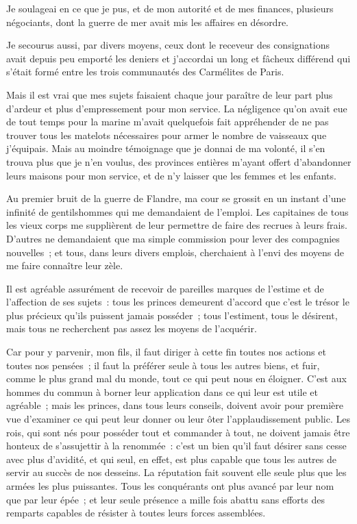 \documentclass[french,twoside]{book} %
\begin{document}
Je soulageai en ce que je pus, et de mon autorité et de mes finances, plusieurs négociants, dont la guerre de mer avait mis les affaires en désordre.\par
Je secourus aussi, par divers moyens, ceux dont le receveur des consignations avait depuis peu emporté les deniers et j’accordai un long et fâcheux différend qui s’était formé entre les trois communautés des Carmélites de Paris.\par
Mais il est vrai que mes sujets faisaient chaque jour paraître de leur part plus d’ardeur et plus d’empressement pour mon service. La négligence qu’on avait eue de tout temps pour la marine m’avait quelquefois fait appréhender de ne pas trouver tous les matelots nécessaires pour armer le nombre de vaisseaux que j’équipais. Mais au moindre témoignage que je donnai de ma volonté, il s’en trouva plus que je n’en voulus, des provinces entières m’ayant offert d’abandonner leurs maisons pour mon service, et de n’y laisser que les femmes et les enfants.\par
Au premier bruit de la guerre de Flandre, ma cour se grossit en un instant d’une infinité de gentilshommes qui me demandaient de l’emploi. Les capitaines de tous les vieux corps me supplièrent de leur permettre de faire des recrues à leurs frais. D’autres ne demandaient que ma simple commission pour lever des compagnies nouvelles ; et tous, dans leurs divers emplois, cherchaient à l’envi des moyens de me faire connaître leur zèle.\par
Il est agréable assurément de recevoir de pareilles marques de l’estime et de l’affection de ses sujets : tous les princes demeurent d’accord que c’est le trésor le plus précieux qu’ils puissent jamais posséder ; tous l’estiment, tous le désirent, mais tous ne recherchent pas assez les moyens de l’acquérir.\par
Car pour y parvenir, mon fils, il faut diriger à cette fin toutes nos actions et toutes nos pensées ; il faut la préférer seule à tous les autres biens, et fuir, comme le plus grand mal du monde, tout ce qui peut nous en éloigner. C’est aux hommes du commun à borner leur application dans ce qui leur est utile et agréable ; mais les princes, dans tous leurs conseils, doivent avoir pour première vue d’examiner ce qui peut leur donner ou leur ôter l’applaudissement public. Les rois, qui sont nés pour posséder tout et commander à tout, ne doivent jamais être honteux de s’assujettir à la renommée : c’est un bien qu’il faut désirer sans cesse avec plus d’avidité, et qui seul, en effet, est plus capable que tous les autres de servir au succès de nos desseins. La réputation fait souvent elle seule plus que les armées les plus puissantes. Tous les conquérants ont plus avancé par leur nom que par leur épée ; et leur seule présence a mille fois abattu sans efforts des remparts capables de résister à toutes leurs forces assemblées.\par
\end{document}
